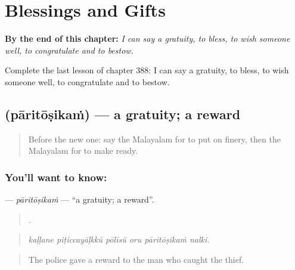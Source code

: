 
\chapter{Blessings and Gifts}
\label{ch:ml-blessings-and-gifts}

\begin{chapteropening}
\textbf{By the end of this chapter:} \emph{I can say a gratuity, to bless, to wish someone well, to congratulate and to bestow.}

Complete the last lesson of chapter 388: I can say a gratuity, to bless, to wish someone well, to congratulate and to bestow.
\end{chapteropening}

\section[\texorpdfstring{\ml{പാരിതോഷികം} (pāritōṣikaṁ)}{പാരിതോഷികം (pāritōṣikaṁ)}]{ (pāritōṣikaṁ) — a gratuity; a reward}

\label{lesson:ML-C388-paritosikam}



\begin{quote}
Before the new one: say the Malayalam for to put on finery, then the Malayalam for to make ready.
\end{quote}

\subsection*{You'll want to know: }
\textbf{} — \emph{pāritōṣikaṁ} — \textquotedblleft{}a gratuity; a reward\textquotedblright{}.

\begin{quote}
     .
\end{quote}

\begin{quote}
\emph{kaḷḷane piṭiccayāḷkkŭ pōlīsŭ oru pāritōṣikaṁ nalki.}
\end{quote}

\begin{quote}
The police gave a reward to the man who caught the thief.
\end{quote}

